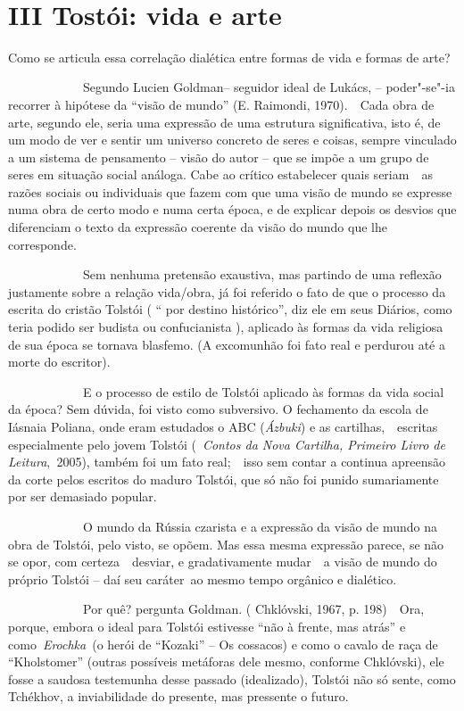 ~

\section{III Tostói: vida e arte}

Como se articula essa correlação dialética entre formas de vida e formas
de arte?

~~~~~~~~~~~~Segundo Lucien Goldman-- seguidor ideal de Lukács, --
poder"-se"-ia recorrer à hipótese da ``visão de mundo'' (E. Raimondi,
1970).~~Cada obra de arte, segundo ele, seria uma expressão de uma
estrutura significativa, isto é, de um modo de ver e sentir um universo
concreto de seres e coisas, sempre vinculado a um sistema de pensamento
-- visão do autor -- que se impõe a um grupo de seres em situação social
análoga. Cabe ao crítico estabelecer quais seriam~~as razões sociais ou
individuais que fazem com que uma visão de mundo se expresse numa obra
de certo modo e numa certa época, e de explicar depois os desvios que
diferenciam o texto da expressão coerente da visão do mundo que lhe
corresponde.

~~~~~~~~~~~~Sem nenhuma pretensão exaustiva, mas partindo de uma
reflexão justamente sobre a relação vida/obra, já foi referido o fato de
que o processo da escrita do cristão Tolstói ( `` por destino
histórico'', diz ele em seus Diários, como teria podido ser budista ou
confucianista ), aplicado às formas da vida religiosa de sua época se
tornava blasfemo. (A excomunhão foi fato real e perdurou até a morte do
escritor).

~~~~~~~~~~~~E o processo de estilo de Tolstói aplicado às formas da vida
social da época? Sem dúvida, foi visto como subversivo. O fechamento da
escola de Iásnaia Poliana, onde eram estudados o ABC (\emph{Ázbuki}) e
as cartilhas,~~escritas especialmente pelo jovem Tolstói (~\emph{Contos
da Nova Cartilha, Primeiro Livro de Leitura},\emph{~}2005), também foi
um fato real;~~isso sem contar a continua apreensão da corte pelos
escritos do maduro Tolstói, que só não foi punido sumariamente por ser
demasiado popular.

~~~~~~~~~~~~O mundo da Rússia czarista e a expressão da visão de mundo
na obra de Tolstói, pelo visto, se opõem. Mas essa mesma expressão
parece, se não se opor, com certeza~~desviar, e gradativamente mudar~~a
visão de mundo do próprio Tolstói -- daí seu caráter~ao mesmo tempo
orgânico e dialético.

~~~~~~~~~~~~Por quê? pergunta Goldman. ( Chklóvski, 1967, p. 198)~~Ora,
porque, embora o ideal para Tolstói estivesse ``não à frente, mas
atrás'' e como~\emph{Erochka}~(o herói de ``Kozaki'' -- Os cossacos) e
como o cavalo de raça de ``Kholstomer'' (outras possíveis metáforas dele
mesmo, conforme Chklóvski), ele fosse a saudosa testemunha desse passado
(idealizado), Tolstói não só sente, como Tchékhov, a inviabilidade do
presente, mas pressente o futuro.

